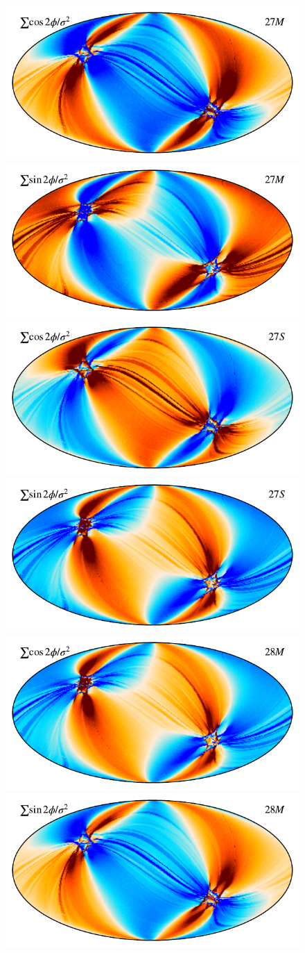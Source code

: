 \documentclass{aa}
\begin{document}
\begin{figure}[t]
  \centering
  \includegraphics[width=0.47\linewidth]{figs/map_Q_polang27M.pdf}
  \includegraphics[width=0.47\linewidth]{figs/map_U_polang27M.pdf}\\
  \includegraphics[width=0.47\linewidth]{figs/map_Q_polang27S.pdf}
  \includegraphics[width=0.47\linewidth]{figs/map_U_polang27S.pdf}\\
  \includegraphics[width=0.47\linewidth]{figs/map_Q_polang28M.pdf}
  \includegraphics[width=0.47\linewidth]{figs/map_U_polang28M.pdf}\\

\end{figure}
\end{document}
